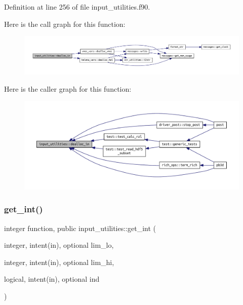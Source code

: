 Definition at line 256 of file input\+\_\+utilities.\+f90.

Here is the call graph for this function\+:
\nopagebreak
\begin{figure}[H]
\begin{center}
\leavevmode
\includegraphics[width=350pt]{namespaceinput__utilities_aa0cf7578f9c9ab6470f8bb8d025f1daf_cgraph}
\end{center}
\end{figure}
Here is the caller graph for this function\+:
\nopagebreak
\begin{figure}[H]
\begin{center}
\leavevmode
\includegraphics[width=350pt]{namespaceinput__utilities_aa0cf7578f9c9ab6470f8bb8d025f1daf_icgraph}
\end{center}
\end{figure}
\mbox{\label{namespaceinput__utilities_a03e09af96ba6f7e187ea4a1d9b743148}} 
\subsubsection{\texorpdfstring{get\+\_\+int()}{get\_int()}}
{\footnotesize\ttfamily integer function, public input\+\_\+utilities\+::get\+\_\+int (\begin{DoxyParamCaption}\item[{integer, intent(in), optional}]{lim\+\_\+lo,  }\item[{integer, intent(in), optional}]{lim\+\_\+hi,  }\item[{logical, intent(in), optional}]{ind }\end{DoxyParamCaption})}



